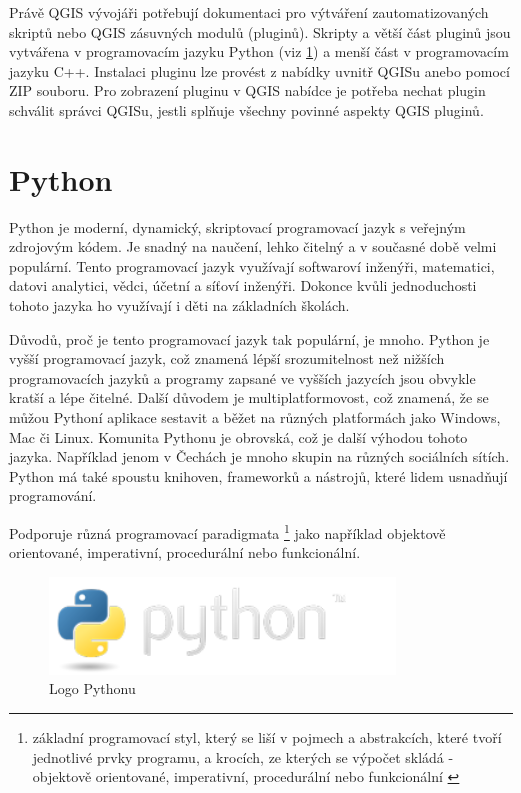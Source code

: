 Právě QGIS vývojáři potřebují dokumentaci pro výtváření zautomatizovaných skriptů nebo QGIS zásuvných modulů (pluginů).
Skripty a větší část pluginů jsou vytvářena v programovacím jazyku Python (viz \ref{section-python})
a menší část v programovacím jazyku C++. Instalaci pluginu lze provést z nabídky uvnitř QGISu
anebo pomocí ZIP souboru. Pro zobrazení pluginu v QGIS nabídce je potřeba nechat plugin
schválit správci QGISu, jestli splňuje všechny povinné aspekty QGIS pluginů.

\section{Python}
\label{section-python}
Python je moderní, dynamický, skriptovací programovací jazyk s veřejným zdrojovým kódem. 
Je snadný na naučení, lehko čitelný a v současné době velmi populární. Tento programovací jazyk využívají
softwaroví inženýři, matematici, datovi analytici, vědci, účetní a síťoví inženýři.
Dokonce kvůli jednoduchosti tohoto jazyka ho využívají i děti na základních školách.

Důvodů, proč je tento programovací jazyk tak populární, je mnoho. Python je vyšší programovací jazyk,
což znamená lépší srozumitelnost než nižších programovacích jazyků a programy zapsané
ve vyšších jazycích jsou obvykle kratší a lépe čitelné.  Další důvodem je multiplatformovost,
což znamená, že se můžou Pythoní aplikace sestavit a běžet na různých platformách jako 
Windows, Mac či Linux. Komunita Pythonu je obrovská, což je další výhodou tohoto jazyka.
Například jenom v Čechách je mnoho skupin na různých sociálních sítích.
Python má také spoustu knihoven, frameworků a nástrojů, které lidem usnadňují programování.

Podporuje různá programovací paradigmata
\footnote{základní programovací styl, který se liší v pojmech a abstrakcích,
které tvoří jednotlivé prvky programu, a krocích, ze kterých se výpočet skládá  
- objektově orientované, imperativní, procedurální nebo funkcionální \cite{wikipedia-paradigma}} 
jako například objektově orientované, imperativní, procedurální nebo funkcionální.

\begin{figure}[H] \centering
    \includegraphics[width=260pt]{./pictures/python-logo.png}
    \caption[Logo Pythonu]{Logo Pythonu \cite{python}}
	\label{fig:python-logo}                                
\end{figure} 

